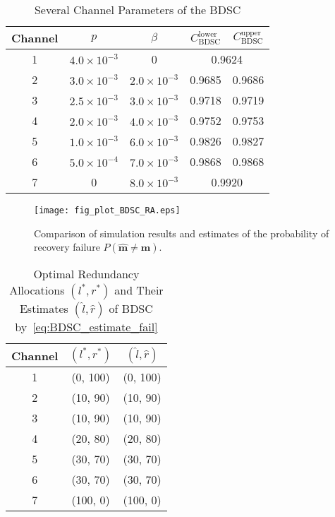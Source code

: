 \documentclass[10pt,twocolumn,twoside,submit]{JCNtran}
\begin{document}
	\begin{table}[t]
		\renewcommand{\arraystretch}{1.3}
		\caption{Several Channel Parameters of the BDSC}
		\label{tab:BDSC_channel}
		\centering
		{\small
			\begin{tabular}{c|c|c|c|c}
				\hline
				Channel & {$p$}                & {$\beta$}            & $C_{\text{BDSC}}^{\text{lower}}$ & $C_{\text{BDSC}}^{\text{upper}}$  \\ \hline \hline
				1       & $4.0 \times 10^{-3}$ & 0                    & \multicolumn{2}{c}{0.9624} \\ \hline
				2       & $3.0 \times 10^{-3}$ & $2.0 \times 10^{-3}$ & 0.9685 & 0.9686        \\ \hline
				3       & $2.5 \times 10^{-3}$ & $3.0 \times 10^{-3}$ & 0.9718 & 0.9719        \\ \hline
				4       & $2.0 \times 10^{-3}$ & $4.0 \times 10^{-3}$ & 0.9752 & 0.9753        \\ \hline
				5       & $1.0 \times 10^{-3}$ & $6.0 \times 10^{-3}$ & 0.9826 & 0.9827        \\ \hline
				6       & $5.0 \times 10^{-4}$ & $7.0 \times 10^{-3}$ & 0.9868 & 0.9868        \\ \hline
				7       &  0                   & $8.0 \times 10^{-3}$ & \multicolumn{2}{c}{0.9920}        \\ \hline
			\end{tabular}
		}
		\vspace{-2mm}
	\end{table}	
	
	\begin{figure}[!t]
		\centering
		\texttt{[image: fig\_plot\_BDSC\_RA.eps]}
		\caption{Comparison of simulation results and estimates of the probability of recovery failure $P\left( \widehat{\mathbf{m}} \ne \mathbf{m} \right)$.}
		\label{fig:plot_BDSC_RA}
		\vspace{-3mm}
	\end{figure}
	
	\begin{table}[t]
	\renewcommand{\arraystretch}{1.3}
	\caption{Optimal Redundancy Allocations $(l^*, r^*)$ and Their Estimates $(\widehat{l}, \widehat{r})$ of BDSC by~\eqref{eq:BDSC_estimate_fail}}
	\label{tab:BDSC_redundancy}
	\centering
	{\small
		\begin{tabular}{c|c|c}
			\hline
			Channel & $(l^*, r^*)$ & $(\widehat{l}, \widehat{r})$ \\ \hline \hline
			1 & (0, 100) & (0, 100)    \\ \hline
			2 & (10, 90) & (10, 90)   \\ \hline
			3 & (10, 90) & (10, 90)  \\ \hline
			4 & (20, 80) & (20, 80)   \\ \hline
			5 & (30, 70) & (30, 70)   \\ \hline
			6 & (30, 70) & (30, 70)   \\ \hline
			7 & (100, 0) & (100, 0) \\ \hline
		\end{tabular}}
		\vspace{-5mm}
	\end{table}
	
\end{document}
